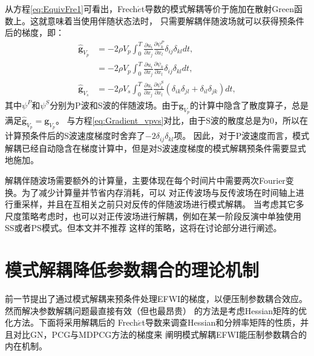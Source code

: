 从方程\eqref{eq:EquivFre1}可看出，Frech$\acute{e}$t导数的模式解耦等价于施加在散射Green函数上。这就意味着当使用伴随状态法时，
只需要解耦伴随波场就可以获得预条件后的梯度，即：
\begin{equation} 
        \begin{split} 
                \hat{\mathbf{g}}_{V_p}&=-2\rho V_p\int_{0}^{T}\frac{\partial u_i}{\partial
        x_j}\frac{\partial \psi^P_k}{\partial x_l}
        \delta_{ij}\delta_{kl}dt,\\
        &=-2\rho V_p\int_{0}^{T}\frac{\partial u_i}{\partial
        x_j}\frac{\partial \psi_k}{\partial x_l}
        \delta_{ij}\delta_{kl}dt,\\
                \hat{\mathbf{g}}_{V_s}&=-2\rho V_s\int_{0}^{T}\frac{\partial u_i}{\partial
        x_j}\frac{\partial \psi^S_k}{\partial x_l}
        (\delta_{ik}\delta_{jl}+\delta_{il}\delta_{jk})dt,
        \end{split}
        \label{eq:DeGradient_vpvs} 
\end{equation}
其中$\psi^P$和$\psi^S$分别为P波和S波的伴随波场。由于$\mathbf{g}_{V_p}$的计算中隐含了散度算子，总是满足$\hat{\mathbf{g}}_{V_p}=\mathbf{g}_{V_p}$。
与方程\eqref{eq:Gradient_vpvs}对比，由于S波的散度总是为0，所以在计算预条件后的S波速度梯度时舍弃了$-2\delta_{ij}\delta_{kl}$项。
因此，对于P波速度而言，模式解耦已经自动隐含在梯度计算中，但是对S波速度梯度的模式解耦预条件需要显式地施加。

解耦伴随波场需要额外的计算量，主要体现在每个时间片中需要两次Fourier变换。为了减少计算量并节省内存消耗，可以
对正传波场与反传波场在时间轴上进行重采样，并且在互相关之前只对反传的伴随波场进行模式解耦。
当考虑其它多尺度策略考虑时，也可以对正传波场进行解耦，例如在某一阶段反演中单独使用SS或者PS模式。但本文并不推荐
这样的策略，这将在讨论部分进行阐述。
\section{模式解耦降低参数耦合的理论机制}
	前一节提出了通过模式解耦来预条件处理EFWI的梯度，以便压制参数耦合效应。然而解决参数解耦问题最直接有效（但也最昂贵）
的方法是考虑Hessian矩阵的优化方法。下面将采用解耦后的
Frech$\acute{e}$t导数来调查Hessian和分辨率矩阵的性质，并且对比GN，PCG与MDPCG方法的梯度来
阐明模式解耦EFWI能压制参数耦合的内在机制。
